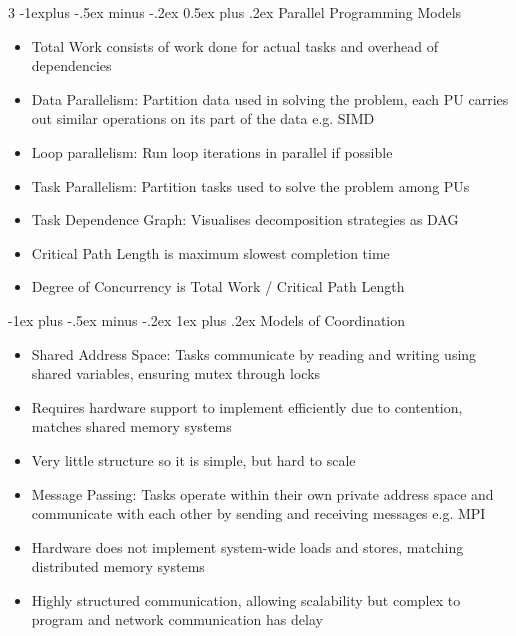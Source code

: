 \documentclass[10pt, landscape]{article}
\makeatletter
\renewcommand{\section}{\@startsection{section}{1}{0mm}%
                                {-1ex plus -.5ex minus -.2ex}%
                                {0.5ex plus .2ex}%
                                {\normalfont\large\bfseries}}
\renewcommand{\section}{\@startsection{section}{2}{0mm}%
                                {-1explus -.5ex minus -.2ex}%
                                {0.5ex plus .2ex}%
                                {\normalfont\normalsize\bfseries}}
\renewcommand{\subsection}{\@startsection{subsection}{3}{0mm}%
                                {-1ex plus -.5ex minus -.2ex}%
                                {1ex plus .2ex}%
                                {\normalfont\small\bfseries}}%
\makeatother
\begin{document}
\begin{multicols*}{3}
\section{Parallel Programming Models}
\begin{itemize}
    \item Total Work consists of work done for actual tasks and overhead of dependencies
    \item Data Parallelism: Partition data used in solving the problem, each PU carries out similar operations on its part of the data e.g. SIMD
    \item Loop parallelism: Run loop iterations in parallel if possible
    \item Task Parallelism: Partition tasks used to solve the problem among PUs
    \item Task Dependence Graph: Visualises decomposition strategies as DAG
    \item Critical Path Length is maximum slowest completion time
    \item Degree of Concurrency is Total Work / Critical Path Length
\end{itemize}

\subsection{Models of Coordination}
\begin{itemize}
    \item Shared Address Space: Tasks communicate by reading and writing using shared variables, ensuring mutex through locks
    \item Requires hardware support to implement efficiently due to contention, matches shared memory systems
    \item Very little structure so it is simple, but hard to scale
    \item Message Passing: Tasks operate within their own private address space and communicate with each other by sending and receiving messages e.g. MPI
    \item Hardware does not implement system-wide loads and stores, matching distributed memory systems
    \item Highly structured communication, allowing scalability but complex to program and network communication has delay
\end{itemize}


\end{multicols*}
\end{document}
